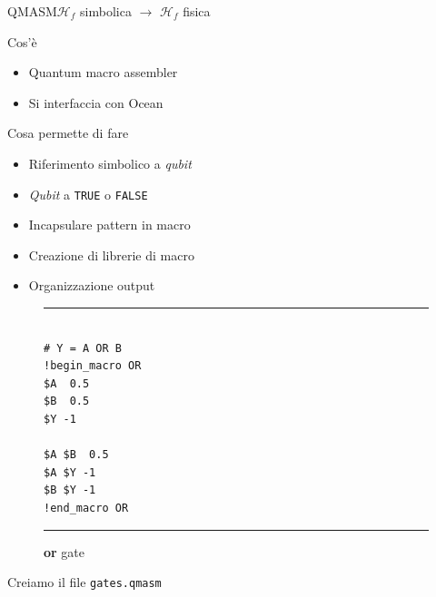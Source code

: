 \begin{frame}[fragile]{QMASM}{$\mathcal{H}_f$ simbolica  $\rightarrow$ $\mathcal{H}_f$ fisica}
	\begin{minipage}{.48\linewidth}
		\begin{block}{Cos'è}
			\begin{itemize}
				\item Quantum macro assembler
				\item Si interfaccia con Ocean
			\end{itemize}
		\end{block}
		\begin{block}{Cosa permette di fare}
			\begin{itemize}
				\item Riferimento simbolico a \emph{qubit}
				\item \emph{Qubit}  a \texttt{TRUE} o \texttt{FALSE}
				\item Incapsulare pattern in macro
				\item Creazione di librerie di macro
				\item Organizzazione output
			\end{itemize}
		\end{block}
	\end{minipage}
	\hfill
	\begin{minipage}{.48\linewidth}
		\begin{figure}[h]
			\begin{minipage}{.6\linewidth}
				\hrule
				\begin{verbatim}
					
# Y = A OR B
!begin_macro OR
$A  0.5
$B  0.5
$Y -1

$A $B  0.5
$A $Y -1
$B $Y -1
!end_macro OR
				\end{verbatim}
				\hrule
			\end{minipage}
			\caption{\textbf{or} gate}
		\end{figure}
		\vspace{-.5cm}
		\begin{center}
			\begin{minipage}{.8\linewidth}
				\begin{block}{}
					\centering
					Creiamo il file \texttt{gates.qmasm} 
				\end{block}
			\end{minipage}
		\end{center}
	\end{minipage}
\end{frame}

